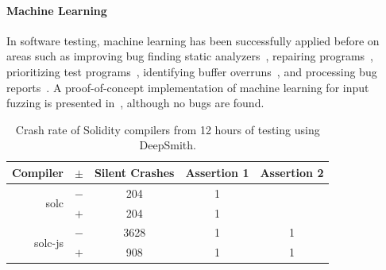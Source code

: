 








\paragraph{Machine Learning} In software testing,
machine learning has been successfully applied before on areas such as improving bug finding static analyzers~\cite{Heo2017,Koc2017}, repairing programs~\cite{Koukoutos2017a,White}, prioritizing test programs~\cite{Chen2017}, identifying buffer overruns~\cite{Choi2016}, and processing bug reports~\cite{Lam2016,Huo2016}. A proof-of-concept implementation of machine learning for input fuzzing is presented in~\cite{Godefroid2017}, although no bugs are found. %

\begin{table}
	\footnotesize %
	\centering %
	\begin{tabular}{rc|ccc}
\toprule
  \textbf{Compiler} & $\pm$ & \textbf{Silent Crashes} & \textbf{Assertion 1} & \textbf{Assertion 2}\\
\midrule
  \multirow{ 2}{*}{solc} & $-$ & 204 & 1 & \\
                         & $+$ & 204 & 1 & \\
  \multirow{ 2}{*}{solc-js} & $-$ & 3628 & 1 & 1\\
                         & $+$ & 908 & 1 & 1\\
\bottomrule
\end{tabular}
	\caption{%
		Crash rate of Solidity compilers from 12 hours of testing using DeepSmith.%
        \vspace{-1em}
	}
	\label{tab:solidity}
\end{table}

